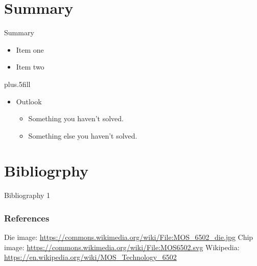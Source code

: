 \documentclass{beamer}
\begin{document}
\section{Summary}

\begin{frame}{Summary}

  \begin{itemize}
  \item
    Item one
  \item
    Item two
  \end{itemize}
  
  \vskip0pt plus.5fill
  \begin{itemize}
  \item
    Outlook
    \begin{itemize}
    \item
      Something you haven't solved.
    \item
      Something else you haven't solved.
    \end{itemize}
  \end{itemize}
\end{frame}

\section{Bibliogrphy}

\begin{frame}{Bibliography 1}
  \frametitle{References}
  \begin{thebibliography}{MOS 6502 Die}
    Die image: {\url{https://commons.wikimedia.org/wiki/File:MOS_6502_die.jpg}}
    Chip image: {\url{https://commons.wikimedia.org/wiki/File:MOS6502.svg}}
    Wikipedia: {\url{https://en.wikipedia.org/wiki/MOS_Technology_6502}}
  \end{thebibliography}
\end{frame}
\end{document}
